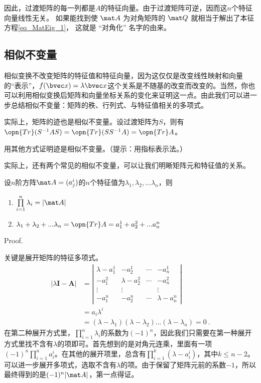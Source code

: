 因此，过渡矩阵的每一列都是$A$的特征向量。由于过渡矩阵可逆，因而这$n$个特征向量线性无关。
如果能找到使 $\mat A$ 为对角矩阵的 $\mat Q$ 就相当于解出了本征方程\autoref{eq_MatEig_1}， 这就是 “对角化” 名字的由来。

\subsection{相似不变量}
相似变换不改变矩阵的特征值和特征向量，因为这仅仅是改变线性映射和向量的“表示”，$f(\bvec x)=\lambda \bvec x$这个关系是不随基的改变而改变的。当然，你也可以利用相似变换后矩阵和向量坐标关系的变化来证明这一点。由此我们可以进一步总结相似不变量：矩阵的秩、行列式、与特征值相关的多项式。

实际上，矩阵的迹也是相似不变量。设过渡矩阵为$S$，则有$\opn {Tr}(S^{-1}AS)=\opn {Tr}(SS^{-1}A)=\opn {Tr}A$。
\begin{exercise}{}
用其他方式证明迹是相似不变量。（提示：用指标表示法。）
\end{exercise}
实际上，还有两个常见的相似不变量，可以让我们明晰矩阵元和特征值的关系。
\begin{theorem}{}
设$n$阶方阵$\mat A=(a^i_j)$的$n$个特征值为$\lambda_1,\lambda_2,...\lambda_n$，则
\begin{enumerate}
\item $\prod\limits^n_{i=1}\lambda_i=|\mat A|$
\item $\lambda_1+\lambda_2+...\lambda_n=\opn{Tr}A =a^1_1+a^2_2+...a^n_n$
\end{enumerate}
\end{theorem}
Proof.

关键是展开矩阵的特征多项式。
\begin{equation}
\begin{aligned}
|\lambda \boldsymbol{I}-\boldsymbol{A}| & =\left|\begin{array}{cccc}
\lambda-a^1_{1} & -a^1_{2} & \cdots & -a^1_{n} \\
-a^2_{1} & \lambda-a^2_{2} & \cdots & -a^2_{ n} \\
\vdots & \vdots & & \vdots \\
-a^n_{ 1} & -a^n_{ 2} & \cdots & \lambda-a^n_{ n}
\end{array}\right| \\
&=a_i\lambda^i\\
& =(\lambda-\lambda_1)(\lambda-\lambda_2)...(\lambda-\lambda_n)=0~.
\end{aligned}
\end{equation}
在第二种展开方式里，$\prod\limits^n_{i=1}\lambda_i$的系数为$(-1)^n$，因此我们只需要在第一种展开方式里找不含有$\lambda$的项即可。首先想到的是对角元连乘，里面有一项$(-1)^{n}\prod \limits^n_{i=1}a^i_i$。在其他的展开项里，总含有$\prod \limits^k_{i=1}(\lambda-a^i_i)$，其中$k\le n-2$。可以进一步展开多项式，选取不含有$\lambda$的项。由于保留了矩阵元前的系数$-1$，所以最终得到的是$(-1)^n |\mat A|$，第一点得证。

